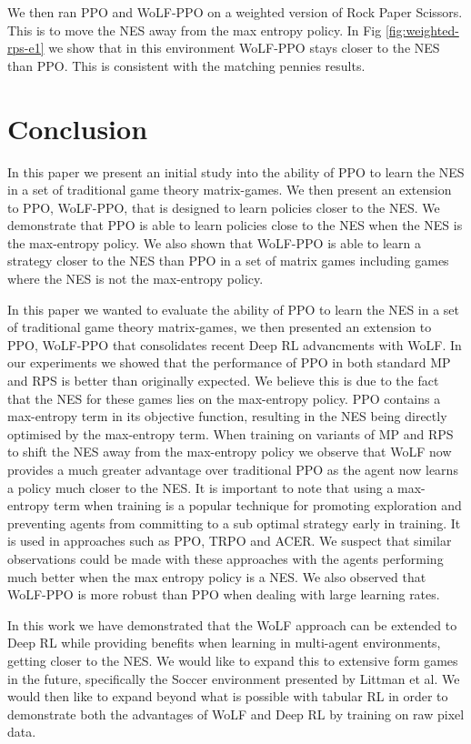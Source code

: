 \documentclass[conference]{IEEEtran}
\begin{document}
We then ran PPO and WoLF-PPO on a weighted version of Rock Paper Scissors. This is to move the NES away from the max entropy policy. In Fig \ref{fig:weighted-rps-e1} we show that in this environment WoLF-PPO stays closer to the NES than PPO. This is consistent with the matching pennies results.

\section{Conclusion}


In this paper we present an initial study into the ability of PPO to learn the NES in a set of traditional game theory matrix-games. We then present an extension to PPO, WoLF-PPO, that is designed to learn policies closer to the NES. We demonstrate that PPO is able to learn policies close to the NES when the NES is the max-entropy policy. We also shown that WoLF-PPO is able to learn a strategy closer to the NES than PPO in a set of matrix games including games where the NES is not the max-entropy policy.

In this paper we wanted to evaluate the ability of PPO to learn the NES in a set of traditional game theory matrix-games, we then presented an extension to PPO, WoLF-PPO that consolidates recent Deep RL advancments with WoLF. In our experiments we showed that the performance of PPO in both standard MP and RPS is better than originally expected. We believe this is due to the fact that the NES for these games lies on the max-entropy policy. PPO contains a max-entropy term in its objective function, resulting in the NES being directly optimised by the max-entropy term. When training on variants of MP and RPS to shift the NES away from the max-entropy policy we observe that WoLF now provides a much greater advantage over traditional PPO as the agent now learns a policy much closer to the NES. It is important to note that using a max-entropy term when training is a popular technique for promoting exploration and preventing agents from committing to a sub optimal strategy early in training. It is used in approaches such as PPO\cite{schulman2017proximal}, TRPO\cite{schulman2015trust} and ACER\cite{Wang2017SampleEA}. We suspect that similar observations could be made with these approaches with the agents performing much better when the max entropy policy is a NES. We also observed that WoLF-PPO is more robust than PPO when dealing with large learning rates.

In this work we have demonstrated that the WoLF approach can be extended to Deep RL while providing benefits when learning in multi-agent environments, getting closer to the NES. We would like to expand this to extensive form games in the future, specifically the Soccer environment presented by Littman et al\cite{littman1994markov}. We would then like to expand beyond what is possible with tabular RL in order to demonstrate both the advantages of WoLF and Deep RL by training on raw pixel data.



\end{document}
